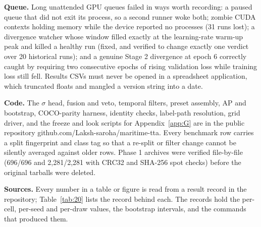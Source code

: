 \documentclass[journal,onecolumn]{IEEEtran}
\begin{document}
\textbf{Queue.} Long unattended GPU queues failed in ways worth recording: a paused queue that did not exit its process, so a second runner woke both; zombie CUDA contexts holding memory while the device reported no processes (31 runs lost); a divergence watcher whose window filled exactly at the learning-rate warm-up peak and killed a healthy run (fixed, and verified to change exactly one verdict over 20 historical runs); and a genuine Stage 2 divergence at epoch 6 correctly caught by requiring two consecutive epochs of rising validation loss while training loss still fell. Results CSVs must never be opened in a spreadsheet application, which truncated floats and mangled a version string into a date.

\textbf{Code.} The $\sigma$ head, fusion and veto, temporal filters, preset assembly, AP and bootstrap, COCO-parity harness, identity checks, label-path resolution, grid driver, and the freeze and look scripts for Appendix~\ref{app:G} are in the public repository github.com/Laksh-saroha/maritime-tta. Every benchmark row carries a split fingerprint and class tag so that a re-split or filter change cannot be silently averaged against older rows. Phase 1 archives were verified file-by-file (696/696 and 2,281/2,281 with CRC32 and SHA-256 spot checks) before the original tarballs were deleted.

\textbf{Sources.} Every number in a table or figure is read from a result record in the repository; Table~\ref{tab:20} lists the record behind each. The records hold the per-cell, per-seed and per-draw values, the bootstrap intervals, and the commands that produced them.
\end{document}
